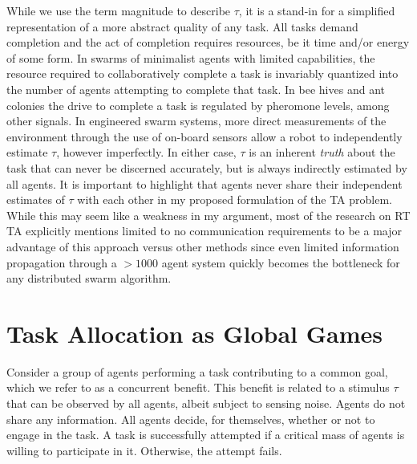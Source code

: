\documentclass[12pt]{book}
\begin{document}
While we use the term magnitude to describe $\tau$, it is a stand-in for a simplified representation of a more abstract quality of any task. All tasks demand completion and the act of completion requires resources, be it time and/or energy of some form. In swarms of minimalist agents with limited capabilities, the resource required to collaboratively complete a task is invariably quantized into the number of agents attempting to complete that task. In bee hives and ant colonies the drive to complete a task is regulated by pheromone levels, among other signals.  In engineered swarm systems, more direct measurements of the environment through the use of on-board sensors allow a robot to independently estimate $\tau$, however imperfectly. In either case, $\tau$ is an inherent \emph{truth} about the task that can never be discerned accurately, but is always indirectly estimated by all agents. It is important to highlight that agents never share their independent estimates of $\tau$ with each other in my proposed formulation of the TA problem. While this may seem like a weakness in my argument, most of the research on RT TA explicitly mentions limited to no communication requirements to be a major advantage of this approach versus other methods since even limited information propagation through a $>1000$ agent system quickly becomes the bottleneck for any distributed swarm algorithm.

\section{Task Allocation as Global Games}\label{sec:globalgame}
Consider a group of agents performing a task contributing to a common goal, which we refer to as a concurrent benefit. This benefit is related to a stimulus $\tau$ that can be observed by all agents, albeit subject to sensing noise. Agents do not share any information. All agents decide, for themselves, whether or not to engage in the task. A task is successfully attempted if a critical mass of agents is willing to participate in it. Otherwise, the attempt fails.
\end{document}

